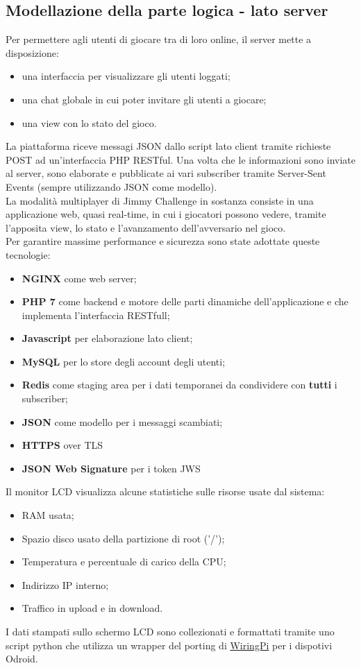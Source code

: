 \subsection{Modellazione della parte logica - lato server}
Per permettere agli utenti di giocare tra di loro online, il server mette a disposizione:
\begin{itemize}
	\item una interfaccia per visualizzare gli utenti loggati;
	\item una chat globale in cui poter invitare gli utenti a giocare;
	\item una view con lo stato del gioco.
\end{itemize}
La piattaforma riceve messagi JSON dallo script lato client tramite richieste POST ad un'interfaccia PHP RESTful. Una volta che le informazioni sono inviate al server, sono elaborate e pubblicate ai vari subscriber tramite Server-Sent Events (sempre utilizzando JSON come modello).\\
La modalità multiplayer di Jimmy Challenge in sostanza consiste in una applicazione web, quasi real-time, in cui i giocatori possono vedere, tramite l'apposita view, lo stato e l'avanzamento dell'avversario nel gioco.\\
Per garantire massime performance e sicurezza sono state adottate queste tecnologie:
\begin{itemize}
	\item \textbf{NGINX} come web server;
	\item \textbf{PHP 7} come backend e motore delle parti dinamiche dell'applicazione e che implementa l'interfaccia RESTfull;
	\item \textbf{Javascript} per elaborazione lato client;
	\item \textbf{MySQL} per lo store degli account degli utenti;
	\item \textbf{Redis} come staging area per i dati temporanei da condividere con \textbf{tutti} i subscriber;
	\item \textbf{JSON} come modello per i messaggi scambiati;
	\item \textbf{HTTPS} over TLS
	\item \textbf{JSON Web Signature} per i token JWS
\end{itemize}
Il monitor LCD visualizza alcune statistiche sulle risorse usate dal sistema:
\begin{itemize}
	\item RAM usata;
	\item Spazio disco usato della partizione di root ('/');
	\item Temperatura e percentuale di carico della CPU;
	\item Indirizzo IP interno;
	\item Traffico in upload e in download.
\end{itemize}
I dati stampati sullo schermo LCD sono collezionati e formattati tramite uno script python che utilizza un wrapper del porting di \href{https://github.com/hardkernel/WiringPi2-Python}{WiringPi} per i dispotivi Odroid.

